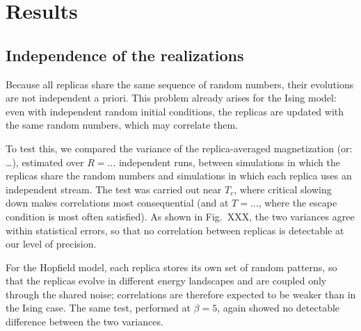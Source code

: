 \section{Results}\label{sec:results}
\subsection{Independence of the realizations}
\label{subsec:independence}

Because all replicas share the same sequence of random numbers, their evolutions are not independent a priori. This problem already arises for the Ising model: even with independent random initial conditions, the replicas are updated with the same random numbers, which may correlate them.

To test this, we compared the variance of the replica-averaged magnetization (or: \ldots), estimated over $R=\ldots$ independent runs, between simulations in which the replicas share the random numbers and simulations in which each replica uses an independent stream. The test was carried out near $T_c$, where critical slowing down makes correlations most consequential (and at $T=\ldots$, where the escape condition is most often satisfied). As shown in Fig.~XXX, the two variances agree within statistical errors, so that no correlation between replicas is detectable at our level of precision.

For the Hopfield model, each replica stores its own set of random patterns, so that the replicas evolve in different energy landscapes and are coupled only through the shared noise; correlations are therefore expected to be weaker than in the Ising case. The same test, performed at $\beta=5$, again showed no detectable difference between the two variances.


\FloatBarrier
